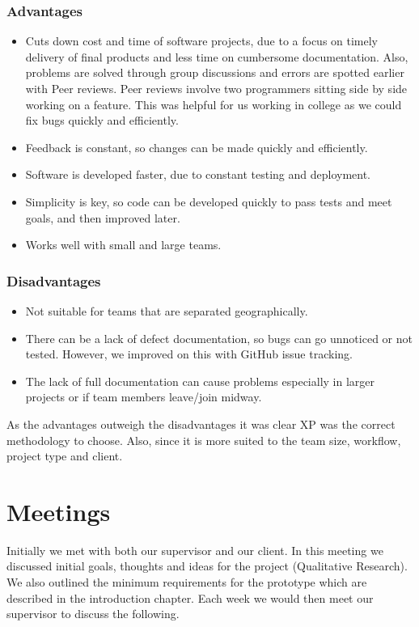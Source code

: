 \subsubsection{Advantages}
\begin{itemize}
  \item Cuts down cost and time of software projects, due to a focus on timely delivery of final products and less time on cumbersome documentation. Also, problems are solved through group discussions and errors are spotted earlier with Peer reviews. Peer reviews involve two programmers sitting side by side working on a feature. This was helpful for us working in college as we could fix bugs quickly and efficiently.
  \item Feedback is constant, so changes can be made quickly and efficiently.
  \item Software is developed faster, due to constant testing and deployment.
  \item Simplicity is key, so code can be developed quickly to pass tests and meet goals, and then improved later.
  \item Works well with small and large teams.
\end{itemize}

\subsubsection{Disadvantages}
\begin{itemize}
  \item Not suitable for teams that are separated geographically.
  \item There can be a lack of defect documentation, so bugs can go unnoticed or not tested. However, we improved on this with GitHub issue tracking.
  \item The lack of full documentation can cause problems especially in larger projects or if team members leave/join midway.
\end{itemize}

As the advantages outweigh the disadvantages it was clear XP was the correct methodology to choose. Also, since it is more suited to the team size, workflow, project type and client.

\section{Meetings}
Initially we met with both our supervisor and our client. In this meeting we discussed initial goals, thoughts and ideas for the project (Qualitative Research). We also outlined the minimum requirements for the prototype which are described in the introduction chapter. Each week we would then meet our supervisor to discuss the following.

